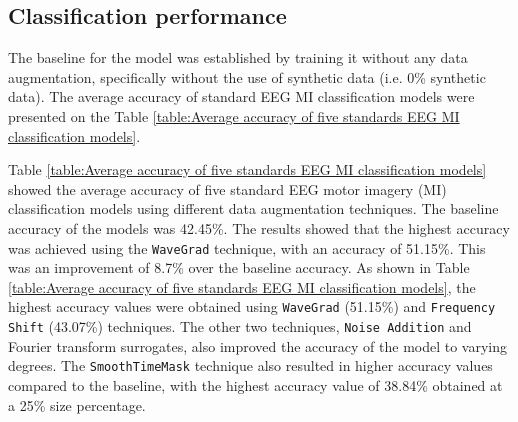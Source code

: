 \documentclass[runningheads]{llncs}
\begin{document}


\subsection{Classification performance}
The baseline for the model was established by training it without any data augmentation, specifically without the use of synthetic data (i.e. 0\% synthetic data). The average accuracy of standard EEG MI classification models were presented on the Table \ref{table:Average accuracy of five standards EEG MI classification models}. 

Table \ref{table:Average accuracy of five standards EEG MI classification models} showed the average accuracy of five standard EEG motor imagery (MI) classification models using different data augmentation techniques. The baseline accuracy of the models was 42.45\%.  The results showed that the highest accuracy was achieved using the \texttt{WaveGrad} technique, with an accuracy of 51.15\%. This was an improvement of 8.7\% over the baseline accuracy. As shown in Table \ref{table:Average accuracy of five standards EEG MI classification models}, the highest accuracy values were obtained using \texttt{WaveGrad} (51.15\%) and \texttt{Frequency Shift} (43.07\%) techniques. The other two techniques, \texttt{Noise Addition} and Fourier transform surrogates, also improved the accuracy of the model to varying degrees. The \texttt{SmoothTimeMask} technique also resulted in higher accuracy values compared to the baseline, with the highest accuracy value of 38.84\% obtained at a 25\% size percentage.

\end{document}
